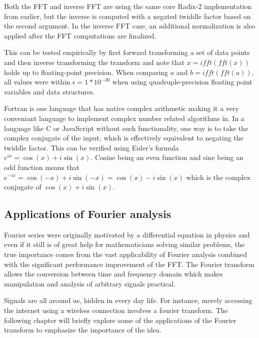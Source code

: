 
Both the FFT and inverse FFT are using the same core Radix-2 implementation from earlier, but the inverse is computed with a negated twiddle factor based on the second argument. In the inverse FFT case, an additional normalization is also applied after the FFT computations are finalized.

This can be tested empirically by first forward transforming a set of data points and then inverse transforming the transform and note that $x = ifft(fft(x))$ holds up to floating-point precision. When comparing $a$ and $b = ifft(fft(a))$, all values were within $\epsilon = 1*10^{-30}$ when using quadruple-precision floating point variables and data structures.

Fortran is one language that has native complex arithmetic making it a very conveniant language to implement complex number related algorithms in. In a language like C or JavaScript without such functionality, one way is to take the complex conjugate of the input, which is effectively equivalent to negating the twiddle factor. This can be verified using Euler's formula $e^{ix} = \cos(x) + i\sin(x)$. Cosine being an even function and sine being an odd function means that $e^{-ix} = \cos(-x) + i\sin(-x) = \cos(x) - i\sin(x)$ which is the complex conjugate of $\cos(x) + i\sin(x)$. 

\subsection{Applications of Fourier analysis}
Fourier series were originally motivated by a differential equation in physics and even if it still is of great help for mathematicians solving similar problems, the true importance comes from the vast applicability of Fourier analysis combined with the significant performance improvement of the FFT. The Fourier transform allows the conversion between time and frequency domain which makes manipulation and analysis of arbitrary signals practical. 

Signals are all around us, hidden in every day life. For instance, merely accessing the internet using a wireless connection involves a fourier transform. The following chapter will briefly explore some of the applications of the Fourier transform to emphasize the importance of the idea. 

